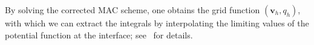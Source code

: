 \documentclass[preprint,11pt]{elsarticle}
\theoremstyle{remark}
\newcommand{\bm}[1]{\boldsymbol{#1}}
\begin{document}
By solving the corrected MAC scheme, one obtains the grid function $(\bm v_h, q_h)$, with which we can extract the integrals by interpolating the limiting values of the potential function at the interface; see~\cite{Ying2007,ZhouYing2024Correction} for details. 
\end{document}
